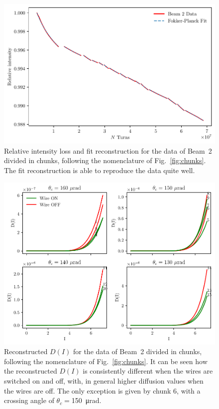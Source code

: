 \begin{figure}[hpt]
    \centering
    \includegraphics[width=1.0\textwidth]{5_wire_compensators_LHC/figs/losses_b2.pdf}
    \caption{Relative intensity loss and fit reconstruction for the data of Beam~2 divided in chunks, following the nomenclature of Fig.~\ref{fig:chunks}. 
    The fit reconstruction is able to reproduce the data quite well.}
    \label{fig:reconstruction_4}
\end{figure}

\begin{figure}[hpt]
    \centering
    \includegraphics[width=1.0\textwidth]{5_wire_compensators_LHC/figs/fokker_planck_b2_2.pdf}
    \caption{Reconstructed $D(I)$ for the data of Beam~2 divided in chunks, following the nomenclature of Fig.~\ref{fig:chunks}. It can be seen how the reconstructed $D(I)$ is consistently different when the wires are switched on and off, with, in general higher diffusion values when the wires are off. The only exception is given by chunk 6, with a crossing angle of $\theta_c=$\SI{150}{\micro\radian}.}
    \label{fig:reconstruction_5}
\end{figure}

